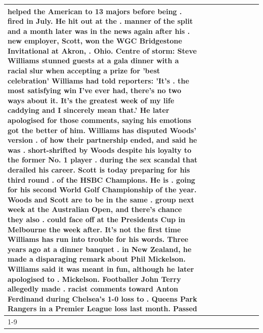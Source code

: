\begin{table}[H]
\begin{tabular}{lllrlllll}
helped the American to 13 majors before being . fired in July. He hit out at the . manner of the split and a month later was in the news again after his . new employer, Scott, won the WGC Bridgestone Invitational at Akron, . Ohio. Centre of storm: Steve Williams stunned guests at a gala dinner with a racial slur when accepting a prize for 'best celebration' Williams had told reporters: 'It's . the most satisfying win I've ever had, there's no two ways about it. It's the greatest week of my life caddying and I sincerely mean that.' He later apologised for those comments, saying his emotions got the better of him. Williams has disputed Woods' version . of how their partnership ended, and said he was . short-shrifted by Woods despite his loyalty to the former No. 1 player . during the sex scandal that derailed his career. Scott is today preparing for his third round . of the HSBC Champions. He is . going for his second World Golf Championship of the year. Woods and Scott are to be in the same . group next week at the Australian Open, and there's chance they also . could face off at the Presidents Cup in Melbourne the week after. It's not the first time Williams has run into trouble for his words. Three years ago at a dinner banquet . in New Zealand, he made a disparaging remark about Phil Mickelson. Williams said it was meant in fun, although he later apologised to . Mickelson. Footballer John Terry allegedly made . racist comments toward Anton Ferdinand during Chelsea's 1-0 loss to . Queens Park Rangers in a Premier League loss last month. Passed \\
\cline{1-9}

\end{tabular}
\end{table}
